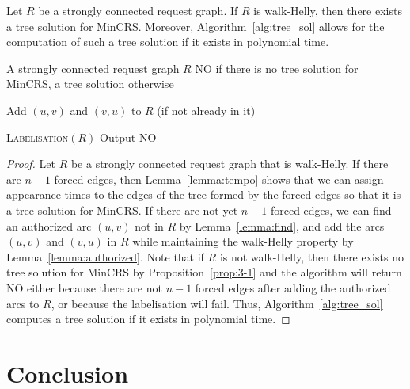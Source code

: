 \documentclass[11pt]{article}%
\newcommand{\betodo}[1]{\todo[color=green]{#1}}
\begin{document}
    



\begin{proposition}
Let $R$ be a strongly connected request graph. If $R$ is walk-Helly, then there exists a tree solution for MinCRS. Moreover, Algorithm~\ref{alg:tree_sol} allows for the computation of such a tree solution if it exists in polynomial time.
\end{proposition}

\begin{algorithm}[h]
	\caption{}
	\label{alg:tree_sol}
	\begin{algorithmic}[1]
	\Require A strongly connected request graph $R$
	\Ensure NO if there is no tree solution for MinCRS, a tree solution otherwise
	
	
	    \State Add $(u,v)$ and $(v,u)$ to $R$ (if not already in it) 
	
	\EndWhile
	
	    \State \textsc{Labelisation}$(R)$
	\Else 
	    \State Output NO
	\EndIf 
	
\end{algorithmic}
\end{algorithm}
\begin{proof}
Let $R$ be a strongly connected request graph that is walk-Helly. If there are $n-1$ forced edges, then Lemma~\ref{lemma:tempo} shows that we can assign appearance times to the edges of the tree formed by the forced edges so that it is a tree solution for MinCRS. If there are not yet $n-1$ forced edges, we can find an authorized arc $(u,v)$ not in $R$ by Lemma~\ref{lemma:find}, and add the arcs $(u,v)$ and $(v,u)$ in $R$ while maintaining the walk-Helly property by Lemma~\ref{lemma:authorized}. 
Note that if $R$ is not walk-Helly, then there exists no tree solution for MinCRS by Proposition~\ref{prop:3-1} and the algorithm will return NO either because there are not $n-1$ forced edges after adding the authorized arcs to $R$, or because the labelisation will fail. 
Thus, Algorithm~\ref{alg:tree_sol} computes a tree solution if it exists in polynomial time. 
\end{proof}



\section{Conclusion}\label{sec:conclusion}
\end{document}
